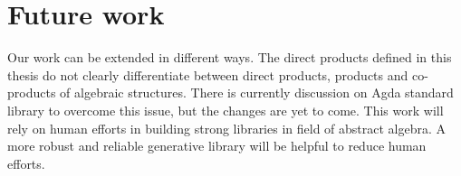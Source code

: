 \section{Future work}
\label{future}
Our work can be extended in different ways. The direct products defined in this
thesis do not clearly differentiate between direct products, products and
co-products of algebraic structures. There is currently discussion on Agda
standard library to overcome this issue, but the changes are yet to come. This
work will rely on human efforts in building strong libraries in field of
abstract algebra. A more robust and reliable generative library will be helpful
to reduce human efforts. 